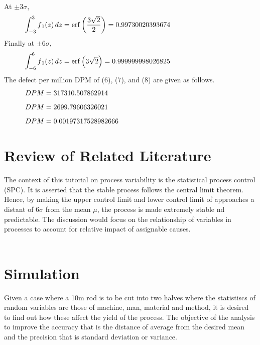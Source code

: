 \documentclass[10pt,journal,compsoc]{IEEEtran} \ifCLASSOPTIONcompsoc
\begin{document}
\noindent At $\pm $$3 \sigma $, 
\begin{equation}
\begin{minipage}{300pt}
 $\displaystyle \int_{-3}^{3} f{_1}(z)\, dz = \operatorname{erf}{\left (\frac{3 \sqrt{2}}{2} \right )} = 0.99730020393674$  
\end{minipage}
\end{equation}
\noindent Finally at $\pm $$6 \sigma $, 
\begin{equation}
\begin{minipage}{300pt}
 $\displaystyle \int_{-6}^{6} f{_1}(z)\, dz = \operatorname{erf}{\left (3 \sqrt{2} \right )} = 0.999999998026825$  
\end{minipage}
\end{equation}
\noindent The defect per million DPM\cite{21} of (6), (7), and (8) are given as follows.
\begin{equation}
\begin{minipage}{300pt}
 $\displaystyle DPM = 317310.507862914$  
\end{minipage}
\end{equation}
\begin{equation}
\begin{minipage}{300pt}
 $\displaystyle DPM = 2699.79606326021$  
\end{minipage}
\end{equation}
\begin{equation}
\begin{minipage}{300pt}
 $\displaystyle DPM = 0.00197317528982666$  
\end{minipage}
\end{equation}
\noindent \section{Review of Related Literature }    The context of this tutorial on process variability is the statistical    process control (SPC)\cite{23}. It is asserted that the stable process follows    the central limit theorem\cite{22}. Hence, by making the upper control limit    and lower control limit of approaches a distant of $6 \sigma$  from the mean    $\mu$, the process is made extremely stable nd predictable. The discussion    would focus on the relationship of variables in processes to account for    relative impact of assignable causes\cite{24}.\\ \\ 
\noindent \section{Simulation}     Given a case where a 10m rod is to be cut into two halves where     the statistiscs of random variables are those of machine, man, material     and method, it is desired to find out how these affect the yield of the     process. The objective of the analysis to improve the accuracy that is     the distance of average from the desired mean and the precision that is     standard deviation or variance. \\ \\ 
\end{document}
